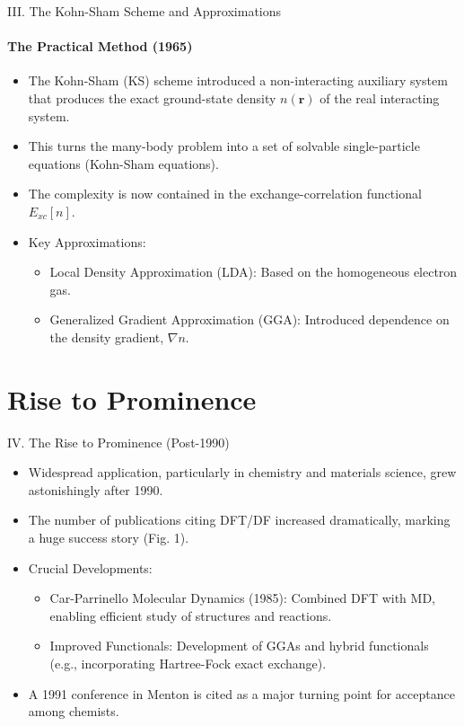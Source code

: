 \begin{frame}{\large III. The Kohn-Sham Scheme and Approximations}
    \framesubtitle{The Practical Method (1965)}
    \begin{itemize}
        \item The Kohn-Sham (KS) scheme introduced a non-interacting auxiliary system that produces the exact ground-state density $n(\mathbf{r})$ of the real interacting system.
        \item This turns the many-body problem into a set of solvable single-particle equations (Kohn-Sham equations).
        \item The complexity is now contained in the exchange-correlation functional $E_{xc}[n]$.
        \item Key Approximations:
        \begin{itemize}
            \item Local Density Approximation (LDA): Based on the homogeneous electron gas.
            \item Generalized Gradient Approximation (GGA): Introduced dependence on the density gradient, $\nabla n$.
        \end{itemize}
    \end{itemize}
\end{frame}

\section{Rise to Prominence}

\begin{frame}{\large IV. The Rise to Prominence (Post-1990)}
    \begin{itemize}
        \item Widespread application, particularly in chemistry and materials science, grew astonishingly after 1990.
        \item The number of publications citing DFT/DF increased dramatically, marking a huge success story (Fig. 1).
        \item Crucial Developments:
        \begin{itemize}
            \item Car-Parrinello Molecular Dynamics (1985): Combined DFT with MD, enabling efficient study of structures and reactions.
            \item Improved Functionals: Development of GGAs and hybrid functionals (e.g., incorporating Hartree-Fock exact exchange).
        \end{itemize}
        \item A 1991 conference in Menton is cited as a major turning point for acceptance among chemists.
    \end{itemize}
\end{frame}

